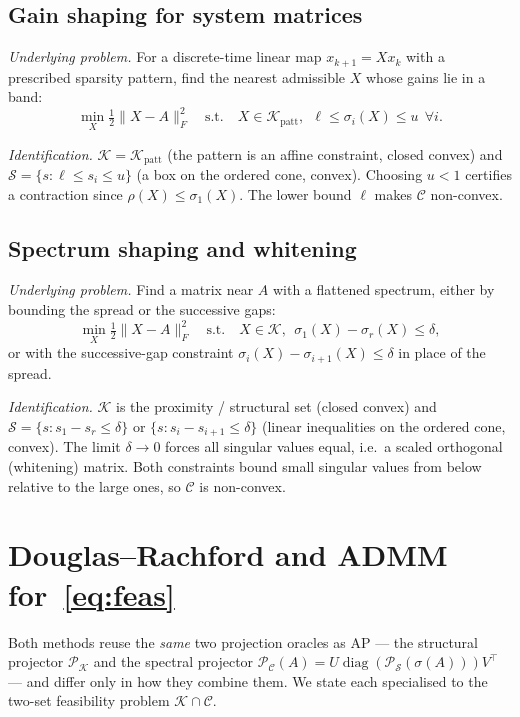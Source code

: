 \documentclass[journal]{IEEEtran}
\DeclareMathOperator{\diag}{diag}
\newcommand{\sgm}{\sigma}
\newcommand{\proj}{\mathcal{P}}
\newcommand{\spec}{\mathcal{S}}
\newcommand{\Kset}{\mathcal{K}}
\newcommand{\Cset}{\mathcal{C}}
\begin{document}
\subsection{Gain shaping for system matrices}
\emph{Underlying problem.} For a discrete-time linear map
$x_{k+1}=Xx_k$ with a prescribed sparsity pattern, find the nearest
admissible $X$ whose gains lie in a band:
\[
\min_X \tfrac12\|X-A\|_F^2
\quad\text{s.t.}\quad
X \in \Kset_{\mathrm{patt}},\ \
\ell \le \sgm_i(X) \le u\ \ \forall i.
\]

\emph{Identification.} $\Kset=\Kset_{\mathrm{patt}}$ (the pattern is an
affine constraint, closed convex) and $\spec=\{s : \ell \le s_i \le u\}$
(a box on the ordered cone, convex). Choosing $u<1$ certifies a
contraction since $\rho(X)\le\sgm_1(X)$. The lower bound $\ell$ makes
$\Cset$ non-convex.

\subsection{Spectrum shaping and whitening}
\emph{Underlying problem.} Find a matrix near $A$ with a flattened
spectrum, either by bounding the spread or the successive gaps:
\[
\min_X \tfrac12\|X-A\|_F^2
\quad\text{s.t.}\quad
X\in\Kset,\ \
\sgm_1(X)-\sgm_r(X)\le\delta,
\]
or with the successive-gap constraint
$\sgm_i(X)-\sgm_{i+1}(X)\le\delta$ in place of the spread.

\emph{Identification.} $\Kset$ is the proximity / structural set (closed
convex) and $\spec=\{s : s_1-s_r\le\delta\}$ or
$\{s : s_i-s_{i+1}\le\delta\}$ (linear inequalities on the ordered cone,
convex). The limit $\delta\to0$ forces all singular values equal, i.e.\
a scaled orthogonal (whitening) matrix. Both constraints bound small
singular values from below relative to the large ones, so $\Cset$ is
non-convex.

\section{Douglas--Rachford and ADMM for~\eqref{eq:feas}}
\label{app:dradmm}

Both methods reuse the \emph{same} two projection oracles as AP --- the
structural projector $\proj_\Kset$ and the spectral projector
$\proj_\Cset(A)=U\diag(\proj_\spec(\sgm(A)))V^\top$ --- and differ only
in how they combine them. We state each specialised to the two-set
feasibility problem $\Kset\cap\Cset$.
\end{document}
